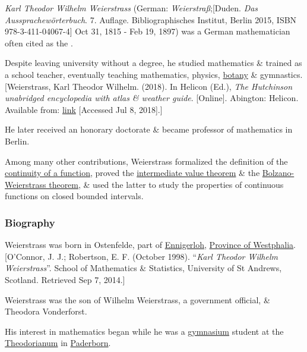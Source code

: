 \documentclass{article}
\begin{document}
\textit{Karl Theodor Wilhelm Weierstrass} (German: \textit{Weierstraß};[Duden. \textit{Das Aussprachewörterbuch}. 7. Auflage. Bibliographisches Institut, Berlin 2015, ISBN 978-3-411-04067-4] Oct 31, 1815 - Feb 19, 1897) was a German mathematician often cited as the .

Despite leaving university without a degree, he studied mathematics \& trained as a school teacher, eventually teaching mathematics, physics, \href{https://en.wikipedia.org/wiki/Botany}{botany} \& gymnastics.[Weierstrass, Karl Theodor Wilhelm. (2018). In Helicon (Ed.), \textit{The Hutchinson unabridged encyclopedia with atlas \& weather guide}. [Online]. Abington: Helicon. Available from: \href{http://libezproxy.open.ac.uk/login?url=https://search.credoreference.com/content/entry/heliconhe/weierstrass_karl_theodor_wilhelm/0?institutionId=292}{link} [Accessed Jul 8, 2018].]

He later received an honorary doctorate \& became professor of mathematics in Berlin.

%
Among many other contributions, Weierstrass formalized the definition of the \href{https://en.wikipedia.org/wiki/Continuous_function}{continuity of a function}, proved the \href{https://en.wikipedia.org/wiki/Intermediate_value_theorem}{intermediate value theorem} \& the \href{https://en.wikipedia.org/wiki/Bolzano-Weierstrass_theorem}{Bolzano-Weierstrass theorem}, \& used the latter to study the properties of continuous functions on closed bounded intervals.

\subsubsection{Biography}
Weierstrass was born in Ostenfelde, part of \href{https://en.wikipedia.org/wiki/Ennigerloh}{Ennigerloh}, \href{https://en.wikipedia.org/wiki/Province_of_Westphalia}{Province of Westphalia}.[O'Connor, J. J.; Robertson, E. F. (October 1998). ``\textit{Karl Theodor Wilhelm Weierstrass}''. School of Mathematics \& Statistics, University of St Andrews, Scotland. Retrieved Sep 7, 2014.]

%
Weierstrass was the son of Wilhelm Weierstrass, a government official, \& Theodora Vonderforst.

His interest in mathematics began while he was a \href{https://en.wikipedia.org/wiki/Gymnasium_(Germany)}{gymnasium} student at the \href{https://en.wikipedia.org/wiki/Gymnasium_Theodorianum}{Theodorianum} in \href{https://en.wikipedia.org/wiki/Paderborn}{Paderborn}.
\end{document}
